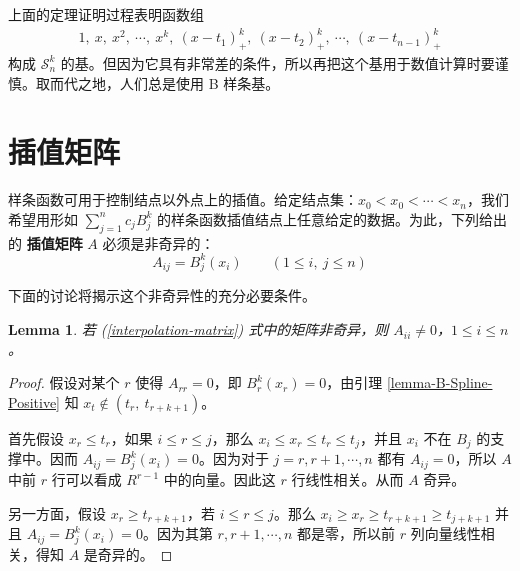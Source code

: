 \documentclass[a4paper]{article}
\newtheorem{lemma}{Lemma}
\begin{document}
    上面的定理证明过程表明函数组
    \begin{gather*}
        1,\ x,\ x^2,\ \cdots,\ x^k,\ (x - t_1)_+^k,\ (x - t_2)_+^k,\ \cdots,\ (x - t_{n-1})_+^k
    \end{gather*}
    构成 $\mathcal{S}_n^k$ 的基。但因为它具有非常差的条件，所以再把这个基用于数值计算时要谨慎。取而代之地，人们总是使用 B 样条基。


\section{插值矩阵}

    样条函数可用于控制结点以外点上的插值。给定结点集：$x_0 < x_0 < \cdots < x_n$，我们希望用形如 $\displaystyle\sum_{j = 1}^{n} c_j B_j^k$ 的样条函数插值结点上任意给定的数据。为此，下列给出的 {\bf 插值矩阵} $A$ 必须是非奇异的：
    \begin{equation}
    \label{interpolation-matrix}
        A_{ij} = B_{j}^{k}(x_{i}) \qquad (1 \leqslant i,\ j \leqslant n)
    \end{equation}

    下面的讨论将揭示这个非奇异性的充分必要条件。
    \begin{lemma}
        若 (\ref{interpolation-matrix}) 式中的矩阵非奇异，则 $A_{ii} \neq 0$，$1 \leqslant i \leqslant n$。
    \end{lemma}
    \begin{proof}
        假设对某个 $r$ 使得 $A_{rr} = 0$，即 $B_r^k (x_r) = 0$，由引理 \ref{lemma-B-Spline-Positive} 知 $x_t \notin (t_{r},\ t_{r+k+1})$。
        
        首先假设 $x_r \leqslant t_r$，如果 $i \leqslant r \leqslant j$，那么 $x_i \leqslant x_r \leqslant t_r \leqslant t_j$，并且 $x_i$ 不在 $B_j$ 的支撑中。因而 $A_{ij} = B_j^k (x_i) = 0$。因为对于 $j = r, r+1, \cdots, n$ 都有 $A_{ij} = 0$，所以 $A$ 中前 $r$ 行可以看成 $R^{r-1}$ 中的向量。因此这 $r$ 行线性相关。从而 $A$ 奇异。
    
        另一方面，假设 $x_{r} \geqslant t_{r+k+1}$，若 $i \leqslant r \leqslant j$。那么 $x_{i} \geqslant x_{r} \geqslant t_{r+k+1} \geqslant t_{j+k+1}$ 并且 $A_{ij} = B_j^k (x_i) = 0$。因为其第 $r, r+1, \cdots, n$ 都是零，所以前 $r$ 列向量线性相关，得知 $A$ 是奇异的。
    \end{proof}
    
\end{document}

